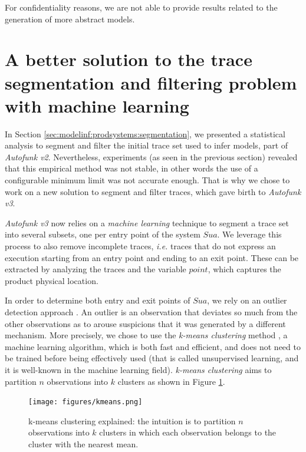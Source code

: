 For confidentiality reasons, we are not able to provide results
related to the generation of more abstract models.


\section{A better solution to the trace segmentation and
filtering problem with machine learning}
\label{sec:modelinf:prodsystems:better-segmentation}

In Section \ref{sec:modelinf:prodsystems:segmentation}, we
presented a statistical analysis to segment and filter the
initial trace set used to infer models, part of \emph{Autofunk
v2}. Nevertheless, experiments (as seen in the previous section)
revealed that this empirical method was not stable, in other
words the use of a configurable minimum limit was not accurate
enough. That is why we chose to work on a new solution to segment
and filter traces, which gave birth to \emph{Autofunk v3}.

\emph{Autofunk v3} now relies on a \emph{machine learning}
technique to segment a trace set into several subsets, one per
entry point of the system $\mathit{Sua}$. We leverage this
process to also remove incomplete traces, \emph{i.e.} traces that
do not express an execution starting from an entry point and
ending to an exit point. These can be extracted by analyzing the
traces and the variable $point$, which captures the product
physical location.

In order to determine both entry and exit points of
$\mathit{Sua}$, we rely on an outlier detection approach
\cite{1695852}. An outlier is an observation that deviates so
much from the other observations as to arouse suspicions that it
was generated by a different mechanism. More precisely, we chose
to use the \emph{k-means clustering} method
\cite{10.2307/2346830}, a machine learning algorithm, which is
both fast and efficient, and does not need to be trained before
being effectively used (that is called unsupervised learning, and
it is well-known in the machine learning field). \textit{k-means
clustering} aims to partition $n$ observations into $k$ clusters
as shown in Figure \ref{fig:kmeans}.

\begin{figure}[ht]
    \begin{center}
        \texttt{[image: figures/kmeans.png]}
    \end{center}

    \caption{k-means clustering explained: the intuition is to
    partition $n$ observations into $k$ clusters in which each
    observation belongs to the cluster with the nearest mean.}
    \label{fig:kmeans}
\end{figure}

